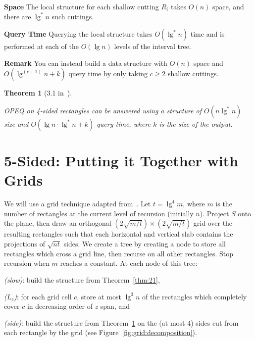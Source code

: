 \documentclass[letterpaper,12pt,twocolumn]{article}
\newcommand\lspace{\hspace{-0.5em}}
\newcommand{\BigOh}[1]{O\!\left(#1\right)}
\theoremstyle{plain}
\newtheorem{theorem}{Theorem}
\begin{document}
\textbf{Space} The local structure for each shallow cutting $R_i$
takes $\BigOh{n}$ space, and there are $\lg^* n$ such cuttings.

\textbf{Query Time} Querying the local structure takes $\BigOh{\lg^*
  n}$ time and is performed at each of the $\BigOh{\lg n}$ levels of
the interval tree.

\textbf{Remark} You can instead build a data structure with
$\BigOh{n}$ space and $\BigOh{\lg^{(c + 1)}n + k}$ query time by only
taking $c \ge 2$ shallow cuttings.

\begin{theorem}[3.1 in~\cite{rahul2015improved}]\label{thm:31}

  OPEQ on 4-sided rectangles can be answered using a structure of
  $\BigOh{n\lg^* n}$ size and $\BigOh{\lg n \cdot \lg^* n + k}$
  query time, where $k$ is the size of the output.

\end{theorem}

\section{\lspace{} 5-Sided: Putting it Together with Grids}
\label{sec:5sided}

We will use a grid technique adapted from~\cite{alstrup2000new}.  Let
$t = \lg^4 m$, where $m$ is the number of rectangles at the current
level of recursion (initially $n$).  Project $S$ onto the plane, then
draw an orthogonal $(2\sqrt{m/t})\times(2\sqrt{m/t})$ grid over the
resulting rectangles such that each horizontal and vertical slab
contains the projections of $\sqrt{nt}$ sides.  We create a tree by
creating a node to store all rectangles which cross a grid line, then
recurse on all other rectangles.  Stop recursion when $m$ reaches a
constant.  At each node of this tree:
%
\begin{enumerate*}[label=(\roman*)] %
\item \emph{(slow)}: build the structure from Theorem~\ref{thm:21},
\item \emph{($L_c$)}: for each grid cell $c$, store at most $\lg^3 n$
  of the rectangles which completely cover $c$ in decreasing order of
  $z$ span, and
\item \emph{(side)}: build the structure from Theorem~\ref{thm:31} on
  the (at most 4) sides cut from each rectangle by the grid (see
  Figure~\ref{fig:grid:decomposition}).
\end{enumerate*}
\end{document}
